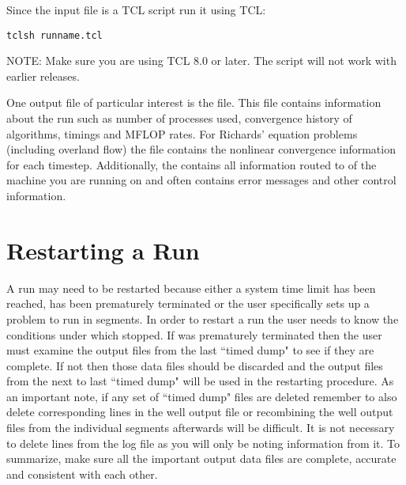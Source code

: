 Since the input file is a TCL script run it using TCL:

\begin{display}\begin{verbatim}
tclsh runname.tcl
\end{verbatim}\end{display}

NOTE: Make sure you are using TCL 8.0 or later.  The script will not
work with earlier releases.

One output file of particular interest is the  file.  This file contains information about the run
such as number of processes used, convergence history of algorithms,
timings and MFLOP rates.  For Richards' equation problems (including overland flow) the  file contains the nonlinear convergence information for each timestep.  Additionally, the  contains all information routed to  of the machine you are running on and often contains error messages and other control information.

\section{Restarting a Run}
\label{Restarting a Run}

A \parflow{} run may need to be restarted because either a
system time limit has been reached, \parflow{} has been prematurely
terminated or the user specifically sets up a problem to run in segments.
In order to restart a run the user needs to know the conditions under which
\parflow{} stopped.  If \parflow{} was prematurely terminated then the
user must examine the output files from the last ``timed dump" to see if
they are complete.  If not then those data files should be discarded and the
output files from the next to last ``timed dump" will be used in the
restarting procedure.  As an important note, if any set of ``timed dump"
files are deleted remember to also delete corresponding lines in the well
output file or recombining the well output files from the individual segments
afterwards will be difficult.  It is not necessary to delete lines from
the log file as you will only be noting information from it.  To summarize,
make sure all the important output data files are complete, accurate and
consistent with each other.

